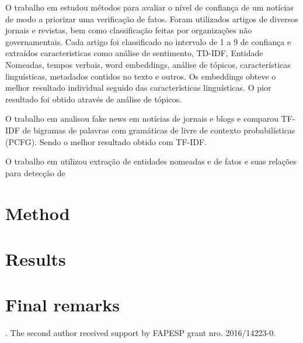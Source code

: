 \documentclass{llncs}
\begin{document}
	
	O trabalho em \cite{Gencheva2017} estudou métodos para avaliar o nível de confiança de um notícias de modo a priorizar uma verificação de fatos. Foram utilizados artigos de diversos jornais e revistas, bem como classificação feitas por organizações não governamentais. Cada artigo foi classificado no intervalo de 1 a 9 de confiança e extraídos caracteristicas como análise de sentimento, TD-IDF,  Entidade Nomeadas, tempos verbais, word embeddings, análise de tópicos, características linguísticas, metadados contidos no texto e outros. Os embeddings obteve o melhor resultado individual seguido das características linguísticas. O pior resultado foi obtido através de análise de tópicos. 
	
	O trabalho em \cite{Gilda2018110} analisou fake news em notícias de jornais e blogs  e comparou TF-IDF de bigramas de palavras com gramáticas de livre de contexto probabilísticas (PCFG). Sendo o melhor resultado obtido com TF-IDF.
	
	O trabalho em \cite{Sharonova201811} utilizou extração de entidades nomeadas e de fatos e suas relações para detecção de
	
	
	
	
	\section{Method}
	\label{sec.method}
	
	
	
	
	\section{Results}
	\label{sec.results}
	
	
	
	\section{Final remarks}
	\label{sec.remarks}
	
	
	. The second author received support by FAPESP grant nro. \mbox{2016/14223-0}.
	
	
	
	
	
	\begin{raggedright}
		
	\end{raggedright}
	
\end{document}
